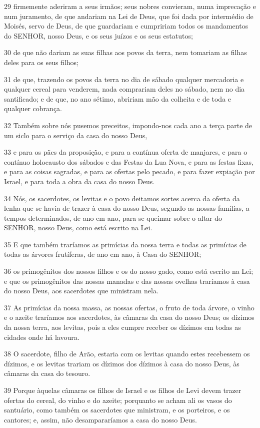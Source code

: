 \par 29 firmemente aderiram a seus irmãos; seus nobres convieram, numa imprecação e num juramento, de que andariam na Lei de Deus, que foi dada por intermédio de Moisés, servo de Deus, de que guardariam e cumpririam todos os mandamentos do SENHOR, nosso Deus, e os seus juízos e os seus estatutos;
\par 30 de que não dariam as suas filhas aos povos da terra, nem tomariam as filhas deles para os seus filhos;
\par 31 de que, trazendo os povos da terra no dia de sábado qualquer mercadoria e qualquer cereal para venderem, nada comprariam deles no sábado, nem no dia santificado; e de que, no ano sétimo, abririam mão da colheita e de toda e qualquer cobrança.
\par 32 Também sobre nós pusemos preceitos, impondo-nos cada ano a terça parte de um siclo para o serviço da casa do nosso Deus,
\par 33 e para os pães da proposição, e para a contínua oferta de manjares, e para o contínuo holocausto dos sábados e das Festas da Lua Nova, e para as festas fixas, e para as coisas sagradas, e para as ofertas pelo pecado, e para fazer expiação por Israel, e para toda a obra da casa do nosso Deus.
\par 34 Nós, os sacerdotes, os levitas e o povo deitamos sortes acerca da oferta da lenha que se havia de trazer à casa do nosso Deus, segundo as nossas famílias, a tempos determinados, de ano em ano, para se queimar sobre o altar do SENHOR, nosso Deus, como está escrito na Lei.
\par 35 E que também traríamos as primícias da nossa terra e todas as primícias de todas as árvores frutíferas, de ano em ano, à Casa do SENHOR;
\par 36 os primogênitos dos nossos filhos e os do nosso gado, como está escrito na Lei; e que os primogênitos das nossas manadas e das nossas ovelhas traríamos à casa do nosso Deus, aos sacerdotes que ministram nela.
\par 37 As primícias da nossa massa, as nossas ofertas, o fruto de toda árvore, o vinho e o azeite traríamos aos sacerdotes, às câmaras da casa do nosso Deus; os dízimos da nossa terra, aos levitas, pois a eles cumpre receber os dízimos em todas as cidades onde há lavoura.
\par 38 O sacerdote, filho de Arão, estaria com os levitas quando estes recebessem os dízimos, e os levitas trariam os dízimos dos dízimos à casa do nosso Deus, às câmaras da casa do tesouro.
\par 39 Porque àquelas câmaras os filhos de Israel e os filhos de Levi devem trazer ofertas do cereal, do vinho e do azeite; porquanto se acham ali os vasos do santuário, como também os sacerdotes que ministram, e os porteiros, e os cantores; e, assim, não desampararíamos a casa do nosso Deus.


